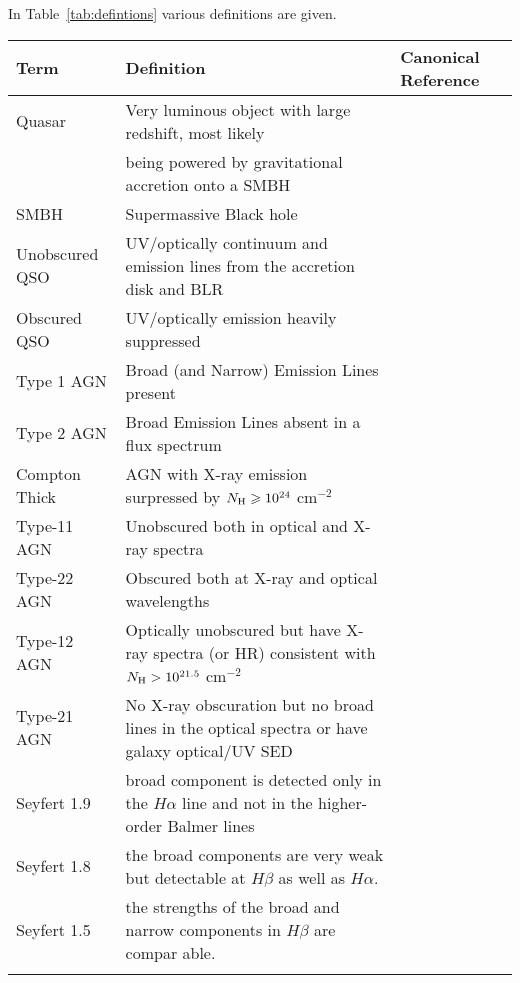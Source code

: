\documentclass[usenatbib]{mn2e}
\begin{document}
In Table~\ref{tab:defintions} various definitions are given. 
\begin{table*}
    \begin{center}
    \setlength{\tabcolsep}{4pt}
    \begin{tabular}{lll}
      \hline
      \hline
    Term  & Definition & Canonical Reference   \\
      \hline
    Quasar & Very luminous object with large redshift, most likely & \\  
                & being powered by gravitational accretion onto a SMBH & \citet{Schmidt63} \\ 
    SMBH & Supermassive Black hole & \citet{LyndenBell_Rees71}\\
    Unobscured QSO  &  UV/optically continuum and emission lines from the accretion disk and BLR & \\
    Obscured QSO     &  UV/optically emission heavily suppressed &\\
    Type 1 AGN     & Broad (and Narrow) Emission Lines present & \\
    Type 2 AGN     & Broad Emission Lines absent in a flux spectrum & \\
    Compton Thick  & AGN with X-ray emission surpressed by $N_{\rm H} \ge 10^{24}$ cm$^{-2}$ & \\
      Type-11 AGN & Unobscured both in optical and X-ray spectra & \citet{Merloni14} \\
      Type-22 AGN & Obscured both at X-ray and optical wavelengths & \citet{Merloni14} \\
      Type-12 AGN & Optically unobscured but have X-ray spectra (or HR) consistent with $N_{\rm H} > 10^{21.5}$ cm$^{-2}$ & \citet{Merloni14} \\ 
      Type-21 AGN & No X-ray obscuration but no broad lines in the optical spectra or have galaxy optical/UV SED & \citet{Merloni14} \\
      Seyfert 1.9 & broad component is detected only in the $H\alpha$ line  and not in the higher-order Balmer lines & \citet{Osterbrock79}\\
      Seyfert 1.8 &  the broad components are very weak but detectable at $H\beta$ as well as $H\alpha$.\\ 
      Seyfert 1.5 & the strengths of the broad and narrow components in $H\beta$ are compar able. & \\
     \hline
    \hline
    \label{tab:defintions}
    \end{tabular}
    \caption{But not only \citep{Schmidt63} }
    \end{center}
    \end{table*}
\end{document}
